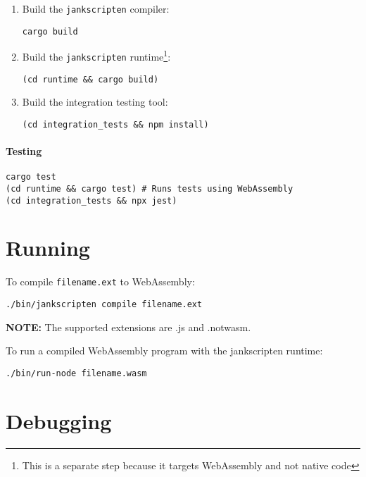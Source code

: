 \documentclass{book}
\newcommand{\system}{\texttt{jankscripten}\xspace}
\begin{document}
\begin{enumerate}

\item Build the \system compiler:
\begin{verbatim}
cargo build
\end{verbatim}

\item Build the \system runtime\footnote{This is a separate step because it
targets WebAssembly and not native code}:
\begin{verbatim}
(cd runtime && cargo build)
\end{verbatim}

\item Build the integration testing tool:
\begin{verbatim}
(cd integration_tests && npm install)
\end{verbatim}

\end{enumerate}

\paragraph{Testing}

\begin{verbatim}
cargo test
(cd runtime && cargo test) # Runs tests using WebAssembly
(cd integration_tests && npx jest)
\end{verbatim}

\section{Running}
    
To compile \texttt{filename.ext} to WebAssembly:

\begin{verbatim}
./bin/jankscripten compile filename.ext
\end{verbatim}

\textbf{NOTE:} The supported extensions are .js and .notwasm.

To run a compiled WebAssembly program with the jankscripten runtime:

\begin{verbatim}
./bin/run-node filename.wasm
\end{verbatim}

\section{Debugging}
\end{document}
